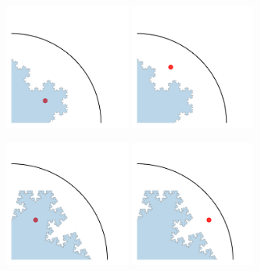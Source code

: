 \documentclass[9pt]{beamer}
\begin{document}
\begin{frame}[noframenumbering]
	\frametitle{}

	\begin{center}
	\includegraphics[height=4.0cm]{figs/int_convex.png}
	\includegraphics[height=4.0cm]{figs/ext_convex.png}
	\end{center}
	\begin{center}
	\includegraphics[height=4.0cm]{figs/int_concave.png}
	\includegraphics[height=4.0cm]{figs/ext_concave.png}
	\end{center}
	
\end{frame}
\end{document}
